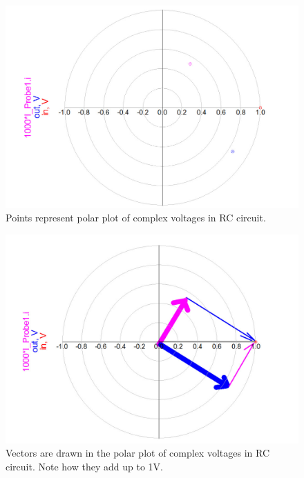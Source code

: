 \documentclass{ximera}
\begin{document}
\begin{example}
\begin{explanation}
\begin{figure}[htbp]
\begin{center}
\includegraphics[scale=0.2]{../jpg/RCvoltPolarPlotADS.jpg}
\end{center}
\caption{\label{PP} Points represent polar plot of complex voltages in RC circuit.}
\end{figure}


\begin{figure}[htbp]
\begin{center}
\includegraphics[scale=0.2]{../jpg/RCvoltPolarPlotVectors.jpg}
\end{center}
\caption{\label{f112} Vectors are drawn in the polar plot of complex voltages in RC circuit. Note how they add up to 1V.}
\end{figure}






\end{explanation}
\end{example}
\end{document}

